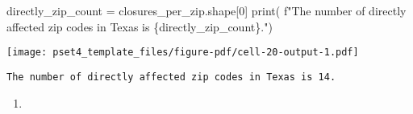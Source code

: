 \documentclass[
  letterpaper,
  DIV=11,
  numbers=noendperiod]{scrartcl}
\newenvironment{Shaded}{\begin{snugshade}}{\end{snugshade}}
\newcommand{\BuiltInTok}[1]{\textcolor[rgb]{0.00,0.23,0.31}{#1}}
\newcommand{\DecValTok}[1]{\textcolor[rgb]{0.68,0.00,0.00}{#1}}
\newcommand{\NormalTok}[1]{\textcolor[rgb]{0.00,0.23,0.31}{#1}}
\newcommand{\OperatorTok}[1]{\textcolor[rgb]{0.37,0.37,0.37}{#1}}
\newcommand{\SpecialCharTok}[1]{\textcolor[rgb]{0.37,0.37,0.37}{#1}}
\newcommand{\SpecialStringTok}[1]{\textcolor[rgb]{0.13,0.47,0.30}{#1}}
\providecommand{\tightlist}{%
  \setlength{\itemsep}{0pt}\setlength{\parskip}{0pt}}\usepackage{longtable,booktabs,array}
\begin{document}
\begin{Shaded}
\begin{Highlighting}[]
\NormalTok{directly\_zip\_count }\OperatorTok{=}\NormalTok{ closures\_per\_zip.shape[}\DecValTok{0}\NormalTok{]}
\BuiltInTok{print}\NormalTok{(}
    \SpecialStringTok{f"The number of directly affected zip codes in Texas is }\SpecialCharTok{\{}\NormalTok{directly\_zip\_count}\SpecialCharTok{\}}\SpecialStringTok{."}\NormalTok{)}
\end{Highlighting}
\end{Shaded}

\texttt{[image: pset4\_template\_files/figure-pdf/cell-20-output-1.pdf]}

\begin{verbatim}
The number of directly affected zip codes in Texas is 14.
\end{verbatim}

\begin{enumerate}
\def\labelenumi{\arabic{enumi}.}
\setcounter{enumi}{2}
\tightlist
\item
\end{enumerate}
\end{document}
